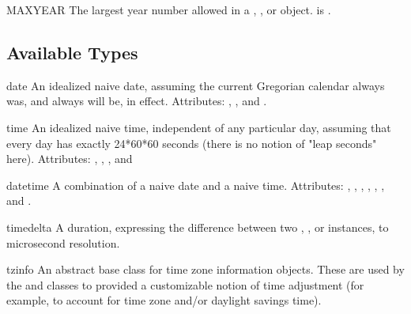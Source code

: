 \begin{datadesc}{MAXYEAR}
  The largest year number allowed in a , ,
  or  object.   is .
\end{datadesc}

\begin{seealso}
\end{seealso}

\subsection{Available Types}

\begin{classdesc*}{date}
  An idealized naive date, assuming the current Gregorian calendar
  always was, and always will be, in effect.
  Attributes: , , and .
\end{classdesc*}

\begin{classdesc*}{time}
  An idealized naive time, independent of any particular day, assuming
  that every day has exactly 24*60*60 seconds (there is no notion
  of "leap seconds" here).
  Attributes: , , , and
\end{classdesc*}

\begin{classdesc*}{datetime}
  A combination of a naive date and a naive time.
  Attributes: , , ,
              , , ,
              and .
\end{classdesc*}

\begin{classdesc*}{timedelta}
  A duration, expressing the difference between two ,
  , or  instances, to microsecond
  resolution.
\end{classdesc*}

\begin{classdesc*}{tzinfo}
  An abstract base class for time zone information objects.  These
  are used by the    and  classes to
  provided a customizable notion of time adjustment (for example, to
  account for time zone and/or daylight savings time).
\end{classdesc*}

